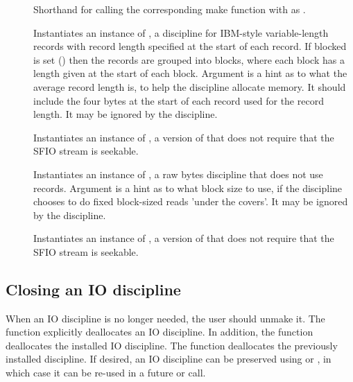 \begin{description}
\item[\small{}]
Shorthand for calling the corresponding  make function with
 as .



\item[\small{}]
 Instantiates an instance of , a discipline for IBM-style
 variable-length records with record length specified at the start
 of each record.  If blocked is set () then the records are
 grouped into blocks, where each block has a length given at the
 start of each block.  Argument  is a hint as to what the
 average record length is, to help the discipline allocate memory.
 It should include the four bytes at the start of each record used for
 the record length.  It may be ignored by the discipline.
 

\item[\small{}] Instantiates an instance of
 , a version of  that does not require
 that the SFIO stream is seekable.


\item[\small{}]
Instantiates an instance of , a raw bytes discipline that
does not use records.  Argument  is a hint as to what block size
to use, if the discipline chooses to do fixed block-sized reads
'under the covers'.  It may be ignored by the discipline.


\item[\small{}]
Instantiates an instance of , a version of 
that does not require that the SFIO stream is seekable.


\end{description}



\subsection{Closing an IO discipline}
When an IO discipline is no longer needed, the user should unmake it.
The function  explicitly deallocates an IO
discipline. In addition, the function 
deallocates the installed IO discipline.  
The function  deallocates the previously
installed discipline.
If desired, an IO discipline can be preserved using
 or , in
which case it can be re-used in a future  or
 call. 

